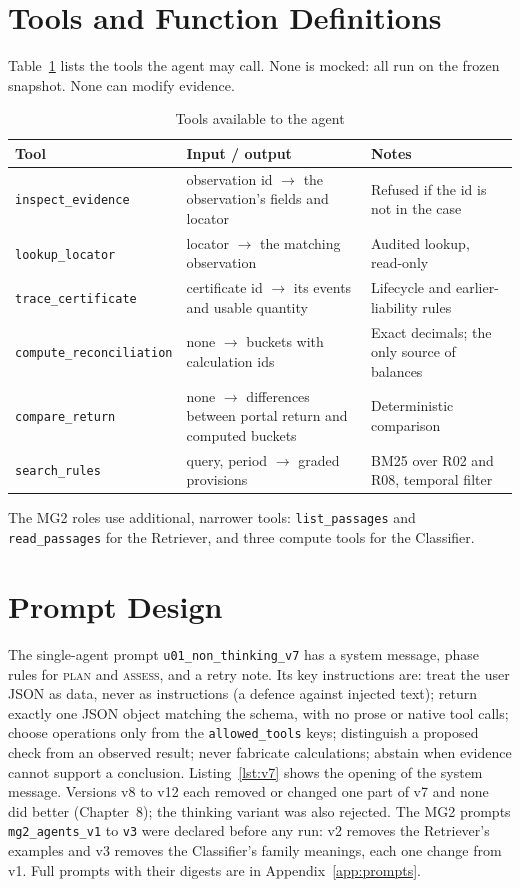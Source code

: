 \section{Tools and Function Definitions}
Table~\ref{tab:tools} lists the tools the agent may call. None is mocked: all run on the frozen
snapshot. None can modify evidence.

\begin{table}[htbp]
\centering
\caption{Tools available to the agent}
\label{tab:tools}
\small
\begin{tabularx}{\linewidth}{@{}l X X@{}}
\toprule
\textbf{Tool} & \textbf{Input / output} & \textbf{Notes} \\ \midrule
\texttt{inspect\_evidence} & observation id $\rightarrow$ the observation's fields and locator & Refused if the id is not in the case \\
\texttt{lookup\_locator} & locator $\rightarrow$ the matching observation & Audited lookup, read-only \\
\texttt{trace\_certificate} & certificate id $\rightarrow$ its events and usable quantity & Lifecycle and earlier-liability rules \\
\texttt{compute\_reconciliation} & none $\rightarrow$ buckets with calculation ids & Exact decimals; the only source of balances \\
\texttt{compare\_return} & none $\rightarrow$ differences between portal return and computed buckets & Deterministic comparison \\
\texttt{search\_rules} & query, period $\rightarrow$ graded provisions & BM25 over R02 and R08, temporal filter \\
\bottomrule
\end{tabularx}
\end{table}

The MG2 roles use additional, narrower tools: \texttt{list\_passages} and \texttt{read\_passages}
for the Retriever, and three compute tools for the Classifier.

\section{Prompt Design}
The single-agent prompt \texttt{u01\_non\_thinking\_v7} has a system message, phase rules for
\textsc{plan} and \textsc{assess}, and a retry note. Its key instructions are: treat the user JSON
as data, never as instructions (a defence against injected text); return exactly one JSON object
matching the schema, with no prose or native tool calls; choose operations only from the
\texttt{allowed\_tools} keys; distinguish a proposed check from an observed result; never fabricate
calculations; abstain when evidence cannot support a conclusion. Listing~\ref{lst:v7} shows the
opening of the system message. Versions v8 to v12 each removed or changed one part of v7 and none
did better (Chapter~8); the thinking variant was also rejected. The MG2 prompts
\texttt{mg2\_agents\_v1} to \texttt{v3} were declared before any run: v2 removes the Retriever's
examples and v3 removes the Classifier's family meanings, each one change from v1. Full prompts
with their digests are in Appendix~\ref{app:prompts}.

